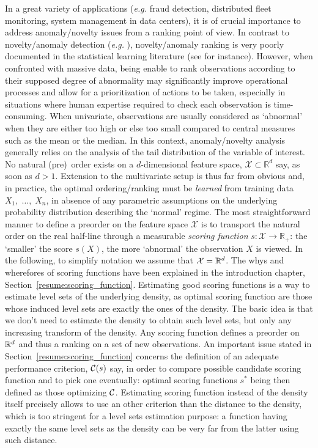 In a great variety of applications  (\textit{e.g.} fraud detection, distributed fleet monitoring, system management in data centers), it is of crucial importance to address anomaly/novelty issues from a ranking point of view. In contrast to novelty/anomaly detection (\textit{e.g.} \cite{Kolt97, VertVert, Scholkopf2001, SHS05}), novelty/anomaly ranking is very poorly documented in the statistical learning literature (see \cite{VCTWMS} for instance). However, when confronted with
massive data, being enable to rank observations according to their supposed
degree of abnormality may significantly improve operational processes and allow for a prioritization of actions to be taken, especially in situations where human expertise required to check each observation is time-consuming.
When univariate, observations are usually considered as `abnormal'
when they are either too high or else too small compared to central
measures such as the mean or the median. In this context, anomaly/novelty analysis generally relies
on the analysis of the tail distribution of the variable of interest.  No natural (pre)~order exists on a $d$-dimensional feature space,  $\mathcal{X} \subset\mathbb{R}^d$ say, as soon as $d>1$. Extension to the multivariate setup is thus far from obvious and, in practice, the optimal ordering/ranking must be \textit{learned} from training data $X_1,\; \ldots,\; X_n$, in absence of any parametric assumptions on the underlying probability distribution describing the `normal' regime. The most straightforward manner to define a preorder on the feature space $\mathcal{X}$ is to transport the natural
order on the real half-line through a measurable \textit{scoring
  function} $s:\mathcal{X} \rightarrow \mathbb{R}_+$: the
`smaller' the score $s(X)$, the more `abnormal' the observation $X$ is
viewed. In the following, to simplify notation we assume that $\mathcal{X} = \mathbb{R}^d$.
%
The whys and wherefores of scoring functions have been explained in the introduction chapter, Section~\ref{resume:scoring_function}. Estimating good scoring functions is a way to estimate level sets of the underlying density, as optimal scoring function are those whose induced level sets are exactly the ones of the density. The basic idea is that we don't need to estimate the density to obtain such level sets, but only any increasing transform of the density.
%
Any scoring function defines a preorder on $\mathbb{R}^d$ and thus a ranking on a set of new observations. An important issue stated in Section~\ref{resume:scoring_function} concerns the definition of an adequate performance criterion, $\mathcal{C}(s)$ say, in order to compare possible candidate scoring function and to pick one eventually: optimal scoring functions $s^*$ being then defined as those optimizing $\mathcal{C}$. 
Estimating scoring function instead of the density itself precisely allows to use an other criterion than the distance to the density, which is too stringent for a level sets estimation purpose: a function having exactly the same level sets as the density can be very far from the latter using such distance.

